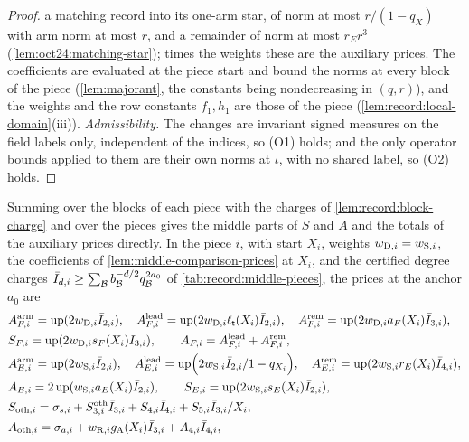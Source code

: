 \begin{proof}
a matching record into its one-arm star, of norm at most $r/(1-q_X)$ with arm
norm at most $r$, and a remainder of norm at most $r_Er^3$
(\cref{lem:oct24:matching-star}); times the weights these are the auxiliary
prices. The coefficients are evaluated at the piece start and bound the norms at
every block of the piece (\cref{lem:majorant}, the constants being
nondecreasing in $(q,r)$), and the weights and the row constants $f_1,h_1$ are
those of the piece (\cref{lem:record:local-domain}(iii)). \emph{Admissibility.}
The changes are invariant signed measures on the field labels only, independent
of the indices, so (O1) holds; and the only operator bounds applied to them are
their own norms at $\iota$, with no shared label, so (O2) holds.
\end{proof}

Summing over the blocks of each piece with the charges of
\cref{lem:record:block-charge} and over the pieces gives the middle parts of $S$
and $A$ and the totals of the auxiliary prices directly. In the piece $i$, with
start $X_i$, weights $w_{{\rm D},i}=w_{{\rm S},i}$, the coefficients of
\cref{lem:middle-comparison-prices} at $X_i$, and the certified degree charges
$\bar I_{d,i}\ge\sum_\mathcal B b_\mathcal B^{-d/2}q_\mathcal B^{2a_0}$ of \cref{tab:record:middle-pieces},
the prices at the anchor $a_0$ are
\begin{equation}\label{eq:middle-piece-prices}
\begin{aligned}
 &A^{\rm arm}_{F,i}=\operatorname{up}(2w_{{\rm D},i}\bar I_{2,i}),\quad
  A^{\rm lead}_{F,i}=\operatorname{up}(2w_{{\rm D},i}\ell_\mathsf t(X_i)\bar I_{2,i}),\quad
  A^{\rm rem}_{F,i}=\operatorname{up}(2w_{{\rm D},i}a_F(X_i)\bar I_{3,i}),\\
 &S_{F,i}=\operatorname{up}(2w_{{\rm D},i}s_F(X_i)\bar I_{3,i}),\qquad
  A_{F,i}=A^{\rm lead}_{F,i}+A^{\rm rem}_{F,i},\\
 &A^{\rm arm}_{E,i}=\operatorname{up}(2w_{{\rm S},i}\bar I_{2,i}),\quad
  A^{\rm lead}_{E,i}=\operatorname{up}\Bigl(2w_{{\rm S},i}\bar I_{2,i}/1-q_{X_i}\Bigr),\quad
  A^{\rm rem}_{E,i}=\operatorname{up}(2w_{{\rm S},i}r_E(X_i)\bar I_{4,i}),\\
 &A_{E,i}=2\operatorname{up}(w_{{\rm S},i}a_E(X_i)\bar I_{2,i}),\qquad
  S_{E,i}=\operatorname{up}(2w_{{\rm S},i}s_E(X_i)\bar I_{2,i}),\\
 &S_{{\rm oth},i}=\sigma_{s,i}+S^{\rm oth}_{3,i}\bar I_{3,i}
       +S_{4,i}\bar I_{4,i}+S_{5,i}\bar I_{3,i}/X_i,\\
 &A_{{\rm oth},i}=\sigma_{a,i}+w_{{\rm R},i}g_{\rm A}(X_i)\bar I_{3,i}
       +A_{4,i}\bar I_{4,i},
\end{aligned}
\end{equation}
